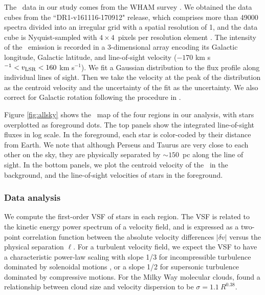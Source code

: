 The \halpha~data in our study comes from the WHAM survey \citep[][]{haffner_wisconsin_2003,haffner_early_2010}. We obtained the data cubes from the ``DR1-v161116-170912" release, which comprises more than 49000 spectra divided into an irregular grid with a spatial resolution of 1\textdegree, and the data cube is Nyquist-sampled with $4\times4$~pixels per resolution element \citep[][]{haffner_wisconsin_2003}. The intensity of the \halpha~emission is recorded in a 3-dimensional array encoding its Galactic longitude, Galactic latitude, and line-of-sight velocity ($-170$ km s$^{-1} < v_{\rm LSR} < 160$ km s$^{-1}$). We fit a Gaussian distribution to the flux profile along individual lines of sight. Then we take the velocity at the peak of the distribution as the centroid velocity and the uncertainty of the fit as the uncertainty. We also correct for Galactic rotation following the procedure in \citet{qu_warm_2020}.

Figure \ref{fig:allsky} shows the \halpha~map of the four regions in our analysis, with stars overplotted as foreground dots. The top panels show the integrated line-of-sight fluxes in log scale. In the foreground, each star is color-coded by their distance from Earth. We note that although Perseus and Taurus are very close to each other on the sky, they are physically separated by $\sim 150$~pc along the line of sight. In the bottom panels, we plot the centroid velocity of the \halpha~in the background, and the line-of-sight velocities of stars in the foreground.

\subsubsection{Data analysis} \label{sec:analysis}

We compute the first-order VSF of stars in each region. The VSF is related to the kinetic energy power spectrum of a velocity field, and is expressed as a two-point correlation function between the absolute velocity differences $|\delta v|$ versus the physical separation $\ell$. For a turbulent velocity field, we expect the VSF to have a characteristic power-law scaling with slope 1/3 for incompressible turbulence dominated by solenoidal motions \citep[][]{kolmogorov_local_1941}, or a slope 1/2 for supersonic turbulence dominated by compressive motions. For the Milky Way molecular clouds, \citet{larson_turbulence_1981} found a relationship between cloud size and velocity dispersion to be $\sigma = 1.1~R^{0.38}$.

